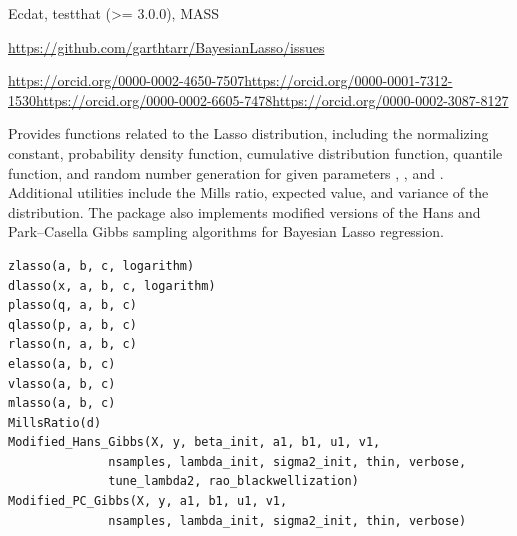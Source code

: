 \documentclass[a4paper]{book}
\begin{document}
\begin{description}
{Ecdat, testthat (>= 3.0.0), MASS}
\item[Config/testthat/edition]
\item[BugReports]\AsIs{}\url{https://github.com/garthtarr/BayesianLasso/issues}\AsIs{}
\item[NeedsCompilation]
\item[Author]\url{https://orcid.org/0000-0002-4650-7507}\url{https://orcid.org/0000-0001-7312-1530}\url{https://orcid.org/0000-0002-6605-7478}\url{https://orcid.org/0000-0002-3087-8127}
\item[Archs]
\end{description}
%
\begin{Description}
Provides functions related to the Lasso distribution, including the normalizing constant,
probability density function, cumulative distribution function, quantile function, and
random number generation for given parameters , , and .
Additional utilities include the Mills ratio, expected value, and variance of the distribution.
The package also implements modified versions of the Hans and Park–Casella Gibbs sampling algorithms
for Bayesian Lasso regression.
\end{Description}
%
\begin{Usage}
\begin{verbatim}
zlasso(a, b, c, logarithm)
dlasso(x, a, b, c, logarithm)
plasso(q, a, b, c)
qlasso(p, a, b, c)
rlasso(n, a, b, c)
elasso(a, b, c)
vlasso(a, b, c)
mlasso(a, b, c)
MillsRatio(d)
Modified_Hans_Gibbs(X, y, beta_init, a1, b1, u1, v1,
              nsamples, lambda_init, sigma2_init, thin, verbose,
              tune_lambda2, rao_blackwellization)
Modified_PC_Gibbs(X, y, a1, b1, u1, v1, 
              nsamples, lambda_init, sigma2_init, thin, verbose)
\end{verbatim}
\end{Usage}
\end{document}
